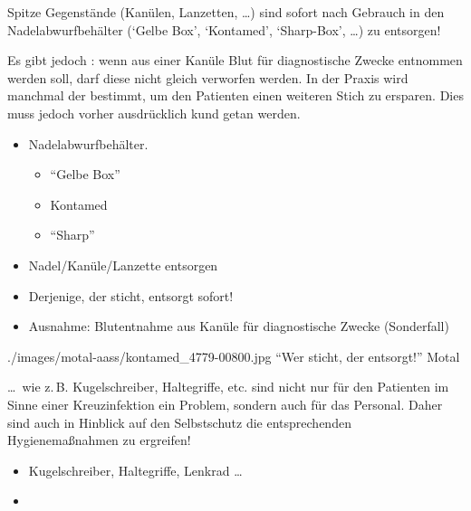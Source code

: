 {%
%
%
\label{topic:nadelabwurfbehaelter}%
\noindent Spitze Gegenstände (Kanülen, Lanz\-et\-ten, \ldots )
sind sofort nach Gebrauch in den Nadelabwurfbehälter (\enquote*{Gelbe Box},
\enquote*{Konta\-med\texttrademark}, \enquote*{Sharp-Box}, \ldots )
zu ent\-sorgen!

Es gibt jedoch : wenn aus einer Kanüle Blut
für diagnostische Zwecke entnommen werden soll, darf diese
nicht gleich verworfen werden. In der Praxis wird manchmal
der  bestimmt, um den
Patienten einen weiteren Stich zu ersparen. Dies muss jedoch
vorher ausdrücklich kund getan werden.


}{
\begin{itemize}
  \item Nadelabwurfbehälter.
  \begin{itemize}
    \item \enquote{Gelbe Box}
    \item Kontamed{\texttrademark}
    \item \enquote{Sharp}
  \end{itemize} 
  \item Nadel/Kanüle/Lanzette  entsorgen
  \item Derjenige, der sticht, entsorgt sofort!
  \item Ausnahme: Blutentnahme aus Kanüle für diagnostische
  Zwecke (Sonderfall)
\end{itemize}
}
{./images/motal-aass/kontamed_4779-00800.jpg}
{\enquote{Wer sticht, der entsorgt!}}
{Motal}


{%
\ldots\ wie z.\,B. Kugelschreiber, Haltegriffe, etc. sind
nicht nur für den Patienten im Sinne einer Kreuzinfektion
ein Problem, sondern auch für das Personal. Daher sind auch
in Hinblick auf den Selbstschutz die entsprechenden
Hygienemaßnahmen zu ergreifen!
}{
\begin{itemize}
  \item Kugelschreiber, Haltegriffe, Lenkrad \ldots{} 
  \item {}
\end{itemize}

}{}{}{}


